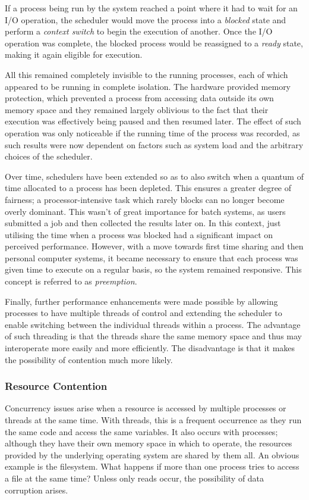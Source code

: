 If a process being run by the system reached a point where it had to
wait for an I/O operation, the scheduler would move the process into a
\emph{blocked} state and perform a \emph{context switch} to begin the
execution of another.  Once the I/O operation was complete, the
blocked process would be reassigned to a \emph{ready} state, making it
again eligible for execution.

All this remained completely invisible to the running processes, each
of which appeared to be running in complete isolation.  The hardware
provided memory protection, which prevented a process from accessing
data outside its own memory space and they remained largely oblivious
to the fact that their execution was effectively being paused and then
resumed later.  The effect of such operation was only noticeable if
the running time of the process was recorded, as such results were now
dependent on factors such as system load and the arbitrary choices of
the scheduler.

Over time, schedulers have been extended so as to also switch when a
quantum of time allocated to a process has been depleted.  This
ensures a greater degree of fairness; a processor-intensive task which
rarely blocks can no longer become overly dominant.  This wasn't of
great importance for batch systems, as users submitted a job and then
collected the results later on.  In this context, just utilising the
time when a process was blocked had a significant impact on perceived
performance.  However, with a move towards first time sharing and then
personal computer systems, it became necessary to ensure that each
process was given time to execute on a regular basis, so the system
remained responsive.  This concept is referred to as
\emph{preemption}.

Finally, further performance enhancements were made possible by
allowing processes to have multiple threads of control and extending
the scheduler to enable switching between the individual threads
within a process.  The advantage of such threading is that the threads
share the same memory space and thus may interoperate more easily and
more efficiently.  The disadvantage is that it makes the possibility
of contention much more likely.

\subsubsection{Resource Contention}

Concurrency issues arise when a resource is accessed by multiple
processes or threads at the same time.  With threads, this is a
frequent occurrence as they run the same code and access the same
variables.  It also occurs with processes; although they have their
own memory space in which to operate, the resources provided by the
underlying operating system are shared by them all.  An obvious
example is the filesystem.  What happens if more than one process
tries to access a file at the same time?  Unless only reads occur, the
possibility of data corruption arises.

